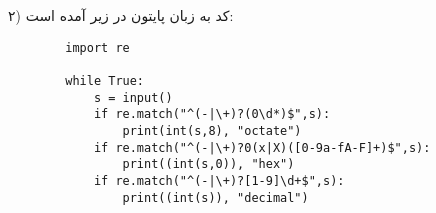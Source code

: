 ۲) کد به زبان پایتون در زیر آمده است:
\begin{latin}
	\begin{verbatim}
		import re  
		 
		while True:
		    s = input()
		    if re.match("^(-|\+)?(0\d*)$",s):
		        print(int(s,8), "octate")
		    if re.match("^(-|\+)?0(x|X)([0-9a-fA-F]+)$",s):
		        print((int(s,0)), "hex")
		    if re.match("^(-|\+)?[1-9]\d+$",s):
		        print((int(s)), "decimal")
	\end{verbatim}
\end{latin}